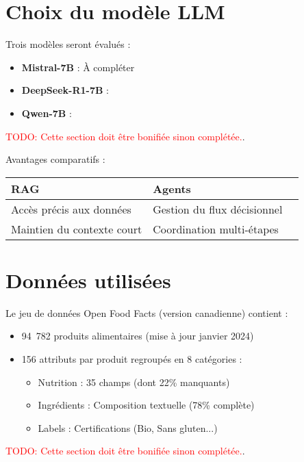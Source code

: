 \documentclass[a4paper,11pt]{article}
\begin{document}
\section{Choix du modèle LLM}
\label{sec:modele}
Trois modèles seront évalués :


\begin{itemize}
    \item \textbf{Mistral-7B} :  À compléter
    \item \textbf{DeepSeek-R1-7B} : 
    \item \textbf{Qwen-7B} : 
\end{itemize}

\textcolor{red}{TODO: Cette section doit être bonifiée sinon complétée.}.


Avantages comparatifs :

\begin{tabularx}{\textwidth}{llX}
\toprule
\textbf{RAG} & \textbf{Agents} \\
\midrule
Accès précis aux données & Gestion du flux décisionnel \\
Maintien du contexte court & Coordination multi-étapes \\
\bottomrule
\end{tabularx}

\section{Données utilisées}
\label{sec:donnees}
Le jeu de données Open Food Facts (version canadienne) contient :

\begin{itemize}
    \item 94~782 produits alimentaires (mise à jour janvier 2024)
    \item 156 attributs par produit regroupés en 8 catégories :
    \begin{itemize}
        \item Nutrition : 35 champs (dont 22\% manquants)
        \item Ingrédients : Composition textuelle (78\% complète)
        \item Labels : Certifications (Bio, Sans gluten...)
    \end{itemize}
\end{itemize}

\textcolor{red}{TODO: Cette section doit être bonifiée sinon complétée.}.
\end{document}
